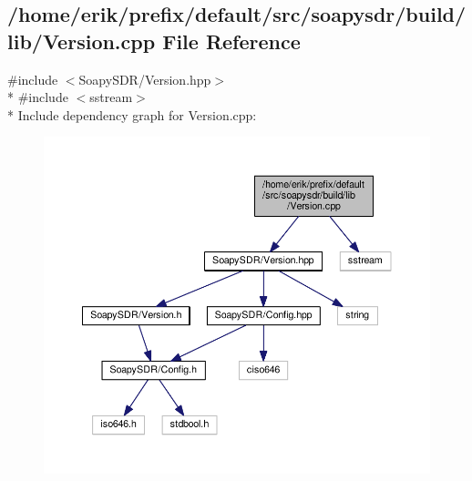 \subsection{/home/erik/prefix/default/src/soapysdr/build/lib/\+Version.cpp File Reference}
\label{Version_8cpp}
{\ttfamily \#include $<$Soapy\+S\+D\+R/\+Version.\+hpp$>$}\\*
{\ttfamily \#include $<$sstream$>$}\\*
Include dependency graph for Version.\+cpp\+:
\nopagebreak
\begin{figure}[H]
\begin{center}
\leavevmode
\includegraphics[width=350pt]{d7/df6/Version_8cpp__incl}
\end{center}
\end{figure}
